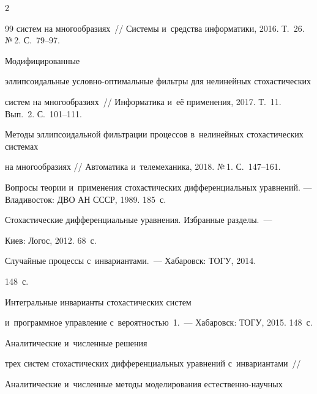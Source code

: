 \begin{multicols}{2}
{{\begin{thebibliography}{99}
систем на многообразиях~// Системы и~средства информатики, 2016. Т.~26. №\,2. С.~79--97.




 Модифицированные 

эллипсоидальные услов\-но-оп\-ти\-маль\-ные фильтры для нелинейных стохастических 

систем на многообразиях~// Информатика и~её применения, 2017. Т.~11. Вып.~2. С.~101--111.





Методы эллипсоидальной фильтрации процессов в~нелинейных стохастических системах 

на многообразиях // Автоматика и~телемеханика, 2018. №\,1. С.~147--161.




 Вопросы теории и~применения стохастических дифференциальных уравнений. --- Владивосток: ДВО АН СССР, 1989. 185~с.




 Стохастические дифференциальные уравнения. Избранные разделы.~--- 

Киев: Логос, 2012. 68~с.




 Случайные процессы с~инвариантами.~--- Хабаровск: ТОГУ, 2014. 

148~с.




 Интегральные инварианты стохастических систем 

и~программное управление с~вероятностью~1.~--- Хабаровск: ТОГУ, 2015. 148~с.




 Аналитические и~численные решения 

трех систем стохастических дифференциальных уравнений с~инвариантами~// 

Аналитические и~численные методы моделирования ес\-те\-ст\-вен\-но-на\-уч\-ных 


\end{thebibliography}}}
\end{multicols}
